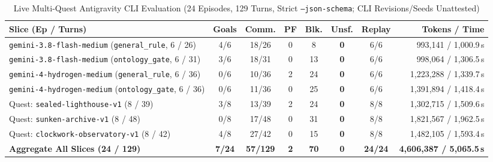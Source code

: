 \begin{table}[!tbp]
\caption{Live Multi-Quest Antigravity CLI Evaluation (24 Episodes, 129 Turns, Strict \texttt{--json-schema}; CLI Revisions/Seeds Unattested)}
\label{tab:multiquest-live}
\centering
\footnotesize
\setlength{\tabcolsep}{4pt}
\begin{tabularx}{\textwidth}{@{}>{\raggedright\arraybackslash}X*{6}{c}r@{}}
\toprule
\textbf{Slice (Ep / Turns)} & \textbf{Goals} & \textbf{Comm.} & \textbf{PF} & \textbf{Blk.} & \textbf{Unsf.} & \textbf{Replay} & \textbf{Tokens / Time} \\
\midrule
\texttt{gemini-3.8-}\allowbreak\texttt{flash-}\allowbreak\texttt{medium} (\texttt{general\_rule}, 6 / 26) & 4/6 & 18/26 & 0 & 8 & \textbf{0} & 6/6 & 993,141 / 1,000.9\,s \\
\texttt{gemini-3.8-}\allowbreak\texttt{flash-}\allowbreak\texttt{medium} (\texttt{ontology\_gate}, 6 / 31) & 3/6 & 18/31 & 0 & 13 & \textbf{0} & 6/6 & 998,064 / 1,306.5\,s \\
\texttt{gemini-4-}\allowbreak\texttt{hydrogen-}\allowbreak\texttt{medium} (\texttt{general\_rule}, 6 / 36) & 0/6 & 10/36 & 2 & 24 & \textbf{0} & 6/6 & 1,223,288 / 1,339.7\,s \\
\texttt{gemini-4-}\allowbreak\texttt{hydrogen-}\allowbreak\texttt{medium} (\texttt{ontology\_gate}, 6 / 36) & 0/6 & 11/36 & 0 & 25 & \textbf{0} & 6/6 & 1,391,894 / 1,418.4\,s \\
\midrule
Quest: \texttt{sealed-lighthouse-v1} (8 / 39) & 3/8 & 13/39 & 2 & 24 & \textbf{0} & 8/8 & 1,302,715 / 1,509.6\,s \\
Quest: \texttt{sunken-archive-v1} (8 / 48) & 0/8 & 17/48 & 0 & 31 & \textbf{0} & 8/8 & 1,821,567 / 1,962.5\,s \\
Quest: \texttt{clockwork-observatory-v1} (8 / 42) & 4/8 & 27/42 & 0 & 15 & \textbf{0} & 8/8 & 1,482,105 / 1,593.4\,s \\
\midrule
\textbf{Aggregate All Slices (24 / 129)} & \textbf{7/24} & \textbf{57/129} & \textbf{2} & \textbf{70} & \textbf{0} & \textbf{24/24} & \textbf{4,606,387 / 5,065.5\,s} \\
\bottomrule
\end{tabularx}
\end{table}

